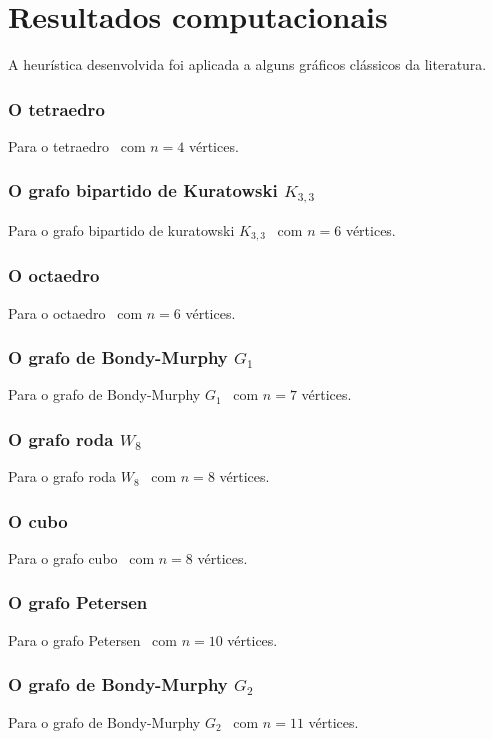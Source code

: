 \part{Resultados computacionais}
\label{sec:resultados}

A heurística desenvolvida foi aplicada a alguns gráficos clássicos da
literatura.

\section{O tetraedro}
Para o tetraedro~\cite{cite:example-plato} com $n=4$ vértices.

\section{O grafo bipartido de Kuratowski $K_{3,3}$}
Para o grafo bipartido de kuratowski
$K_{3,3}$~\cite{cite:example-kuratowski} com $n=6$ vértices.

\section{O octaedro}
Para o octaedro~\cite{cite:example-plato} com $n=6$ vértices.

\section{O grafo de Bondy-Murphy $G_1$}
Para o grafo de Bondy-Murphy $G_1$~\cite{cite:example-bondy} com $n=7$
vértices.

\section{O grafo roda $W_8$}
Para o grafo roda $W_8$~\cite{cite:example-bondy} com $n=8$ vértices.

\section{O cubo}
Para o grafo cubo~\cite{cite:example-plato} com $n=8$ vértices.

\section{O grafo Petersen}
Para o grafo Petersen~\cite{cite:example-petersen} com $n=10$
vértices.

\section{O grafo de Bondy-Murphy $G_2$}
Para o grafo de Bondy-Murphy $G_2$~\cite{cite:example-bondy} com $n=11$
vértices.

